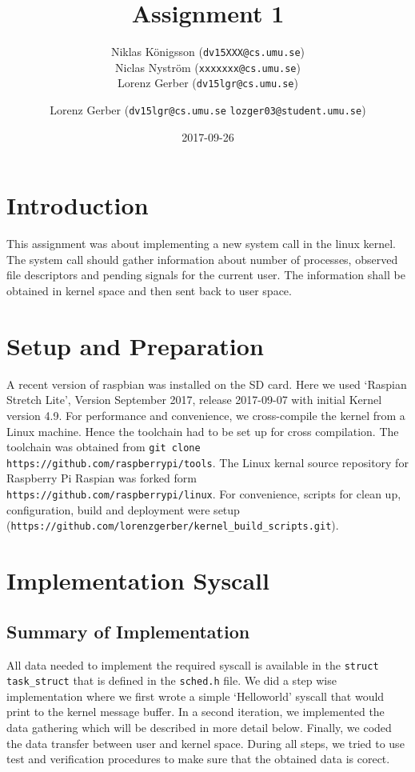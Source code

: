 \documentclass[a4paper,11pt,twoside]{article}
\title{Assignment 1}
\author{Niklas Königsson ({\tt{dv15XXX@cs.umu.se}}) \\
Niclas Nyström ({\tt{xxxxxxx@cs.umu.se}}) \\
Lorenz Gerber ({\tt{dv15lgr@cs.umu.se}})
}
\author{Lorenz Gerber ({\tt{dv15lgr@cs.umu.se}} {\tt{lozger03@student.umu.se}})}
\date{2017-09-26}
\begin{document}
\lstset{language=C}
\maketitle
\thispagestyle{empty}
\newpage

\clearpage
{}

\section{Introduction}
This assignment was about implementing a new system call in the linux kernel. The
system call should gather information about number of processes, observed file
descriptors and pending signals for the current user. The information shall be obtained
in kernel space and then sent back to user space.

\section{Setup and Preparation}
A recent version of raspbian was installed on the SD card. Here we used `Raspian
Stretch Lite', Version September 2017, release 2017-09-07 with initial Kernel version
4.9. For performance and convenience, we cross-compile the kernel from a Linux machine. Hence
the toolchain had to be set up for cross compilation. The toolchain was obtained
from \verb+git clone https://github.com/raspberrypi/tools+. The Linux kernal source
repository for Raspberry Pi Raspian was forked form
\verb+https://github.com/raspberrypi/linux+. For convenience, scripts for clean up,
configuration, build and deployment were setup
(\verb+https://github.com/lorenzgerber/kernel_build_scripts.git+).

\section{Implementation Syscall}
\subsection{Summary of Implementation}
All data needed to implement the required syscall is available in the \verb+struct task_struct+
that is defined in the \verb+sched.h+ file. We did a step wise implementation where
we first wrote a simple `Helloworld' syscall that would print to the kernel message
buffer. In a second iteration, we implemented the data gathering which will be
described in more detail below. Finally, we coded the data transfer between user and
kernel space. During all steps, we tried to use test and verification procedures
to make sure that the obtained data is corect.
\end{document}
